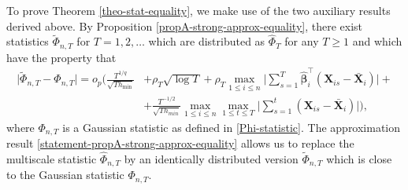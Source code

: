 \documentclass[a4paper,12pt]{article}
\begin{document}
To prove Theorem \ref{theo-stat-equality}, we make use of the two auxiliary results derived above. By Proposition \ref{propA-strong-approx-equality}, there exist statistics $\widetilde{\Phi}_{n, T}$ for $T = 1,2,\ldots$ which are distributed as $\widehat{\Phi}_T$ for any $T \ge 1$ and which have the property that 
\begin{align}\label{statement-propA-strong-approx-equality}
\big| \widetilde{\Phi}_{n, T} - \Phi_{n,T} \big| = o_p \Big( \frac{T^{1/q}}{\sqrt{T h_{\min}}} &+ \rho_T \sqrt{\log T} + \rho_T\max_{1\le i\le n} \Big|\sum\limits_{s=1}^T \widehat{\bm{\beta}}_i^\top(\mathbf{X}_{is} - \bar{\mathbf{X}}_{i} )\Big| +\nonumber\\
&+ \frac{T^{-1/2}}{\sqrt{Th_{min}}} \max_{1 \le i \le n}\max_{1\le t \le T}\Big|\sum\limits_{s=1}^t (\mathbf{X}_{is} - \bar{\mathbf{X}}_{i} )\Big|  \Big),
\end{align}
where $\Phi_{n, T}$ is a Gaussian statistic as defined in \eqref{Phi-statistic}. The approximation result \eqref{statement-propA-strong-approx-equality} allows us to replace the multiscale statistic $\widehat{\Phi}_{n, T}$ by an identically distributed version $\widetilde{\Phi}_{n, T}$ which is close to the Gaussian statistic $\Phi_{n, T}$.


\color{black}{\newpage

{\small
\setlength{\bibsep}{0.55em}
}}
\end{document}
